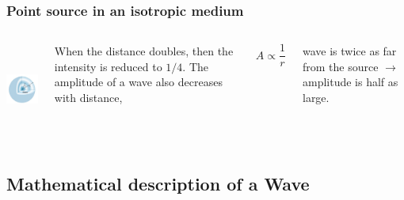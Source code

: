 \documentclass[]{beamer}
\begin{document}
\begin{frame}
  \frametitle{Point source in an isotropic medium}
  
  
  
     \begin{columns}[c]
     \column{2in}  %
    
  \pause
  
   \begin{center}
    \includegraphics[height=1.2in]{images4/8.jpg}
  \end{center}
  
     \column{2.4in}
  
 

  
  When the distance doubles, then the intensity is
  reduced to $1/4$. The amplitude of a wave also decreases with distance,
  
  \pause
  
  \begin{equation}
  A\propto \frac{1}{r}
  \end{equation}
  
  \pause
  
  wave is twice as far from the source $\rightarrow$ amplitude is half as large.
  
\end{columns}
    \end{frame}

\subsection{Mathematical description of a Wave}
\end{document}
